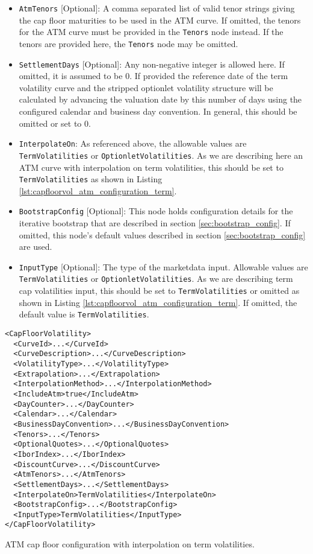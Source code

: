 \begin{itemize}
\item \lstinline!AtmTenors! [Optional]:
A comma separated list of valid tenor strings giving the cap floor maturities to be used in the ATM curve. If omitted, the tenors for the ATM curve must be provided in the \lstinline!Tenors! node instead. If the tenors are provided here, the \lstinline!Tenors! node may be omitted.

\item \lstinline!SettlementDays! [Optional]:
Any non-negative integer is allowed here. If omitted, it is assumed to be 0. If provided the reference date of the term volatility curve and the stripped optionlet volatility structure will be calculated by advancing the valuation date by this number of days using the configured calendar and business day convention. In general, this should be omitted or set to 0.

\item \lstinline!InterpolateOn!:
As referenced above, the allowable values are \lstinline!TermVolatilities! or \lstinline!OptionletVolatilities!. As we are describing here an ATM curve with interpolation on term volatilities, this should be set to \lstinline!TermVolatilities! as shown in Listing \ref{lst:capfloorvol_atm_configuration_term}.

\item \lstinline!BootstrapConfig! [Optional]:
This node holds configuration details for the iterative bootstrap that are described in section \ref{sec:bootstrap_config}. If omitted, this node's default values described in section \ref{sec:bootstrap_config} are used.

\item \lstinline!InputType! [Optional]:
The type of the marketdata input. Allowable values are \lstinline!TermVolatilities! or \lstinline!OptionletVolatilities!. As we are describing term cap volatilities input, this should be set to \lstinline!TermVolatilities! or omitted as shown in Listing \ref{lst:capfloorvol_atm_configuration_term}. If omitted, the default value is \lstinline!TermVolatilities!.

\end{itemize}

\begin{longlisting}
\begin{verbatim}
<CapFloorVolatility>
  <CurveId>...</CurveId>
  <CurveDescription>...</CurveDescription>
  <VolatilityType>...</VolatilityType>
  <Extrapolation>...</Extrapolation>
  <InterpolationMethod>...</InterpolationMethod>
  <IncludeAtm>true</IncludeAtm>
  <DayCounter>...</DayCounter>
  <Calendar>...</Calendar>
  <BusinessDayConvention>...</BusinessDayConvention>
  <Tenors>...</Tenors>
  <OptionalQuotes>...</OptionalQuotes>
  <IborIndex>...</IborIndex>
  <DiscountCurve>...</DiscountCurve>
  <AtmTenors>...</AtmTenors>
  <SettlementDays>...</SettlementDays>
  <InterpolateOn>TermVolatilities</InterpolateOn>
  <BootstrapConfig>...</BootstrapConfig>
  <InputType>TermVolatilities</InputType>
</CapFloorVolatility>
\end{verbatim}
\caption{ATM cap floor configuration with interpolation on term volatilities.}
\label{lst:capfloorvol_atm_configuration_term}
\end{longlisting}

